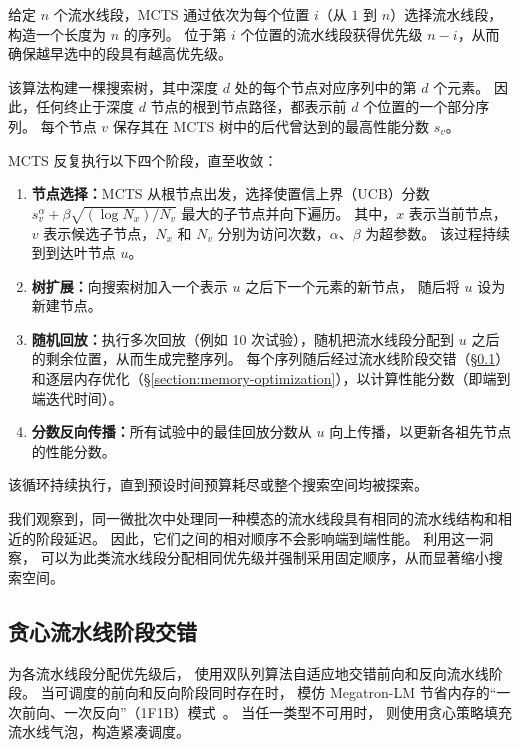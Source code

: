 给定 $n$ 个流水线段，MCTS 通过依次为每个位置 $i$（从 $1$ 到 $n$）选择流水线段，构造一个长度为 $n$ 的序列。
位于第 $i$ 个位置的流水线段获得优先级 $n-i$，从而确保越早选中的段具有越高优先级。

该算法构建一棵搜索树，其中深度 $d$ 处的每个节点对应序列中的第 $d$ 个元素。
因此，任何终止于深度 $d$ 节点的根到节点路径，都表示前 $d$ 个位置的一个部分序列。
每个节点 $v$ 保存其在 MCTS 树中的后代曾达到的最高性能分数 $s_v$。

MCTS 反复执行以下四个阶段，直至收敛：

\begin{enumerate}
    \item \textbf{节点选择：}MCTS 从根节点出发，选择使置信上界（UCB）分数 $s_v^\alpha + \beta\sqrt{(\log{N_x}) / N_v}$ 最大的子节点并向下遍历。
    其中，$x$ 表示当前节点，$v$ 表示候选子节点，$N_x$ 和 $N_v$ 分别为访问次数，$\alpha$、$\beta$ 为超参数。
    该过程持续到到达叶节点 $u$。

    \item \textbf{树扩展：}向搜索树加入一个表示 $u$ 之后下一个元素的新节点，
    随后将 $u$ 设为新建节点。

    \item \textbf{随机回放：}执行多次回放（例如 10 次试验），随机把流水线段分配到 $u$ 之后的剩余位置，从而生成完整序列。
    每个序列随后经过流水线阶段交错（\S\ref{section:stage-interleaving}）和逐层内存优化（\S\ref{section:memory-optimization}），以计算性能分数（即端到端迭代时间）。

    \item \textbf{分数反向传播：}所有试验中的最佳回放分数从 $u$ 向上传播，以更新各祖先节点的性能分数。
\end{enumerate}

该循环持续执行，直到预设时间预算耗尽或整个搜索空间均被探索。

我们观察到，同一微批次中处理同一种模态的流水线段具有相同的流水线结构和相近的阶段延迟。
因此，它们之间的相对顺序不会影响端到端性能。
利用这一洞察，\sys{} 可以为此类流水线段分配相同优先级并强制采用固定顺序，从而显著缩小搜索空间。

\subsection{贪心流水线阶段交错}
\label{section:stage-interleaving}

为各流水线段分配优先级后，
\sys{} 使用双队列算法自适应地交错前向和反向流水线阶段。
当可调度的前向和反向阶段同时存在时，
\sys{} 模仿 Megatron-LM 节省内存的“一次前向、一次反向”（1F1B）模式~\cite{megatron-lm-arxiv20,dynapipe-eurosys24}。
当任一类型不可用时，
则使用贪心策略填充流水线气泡，构造紧凑调度。

